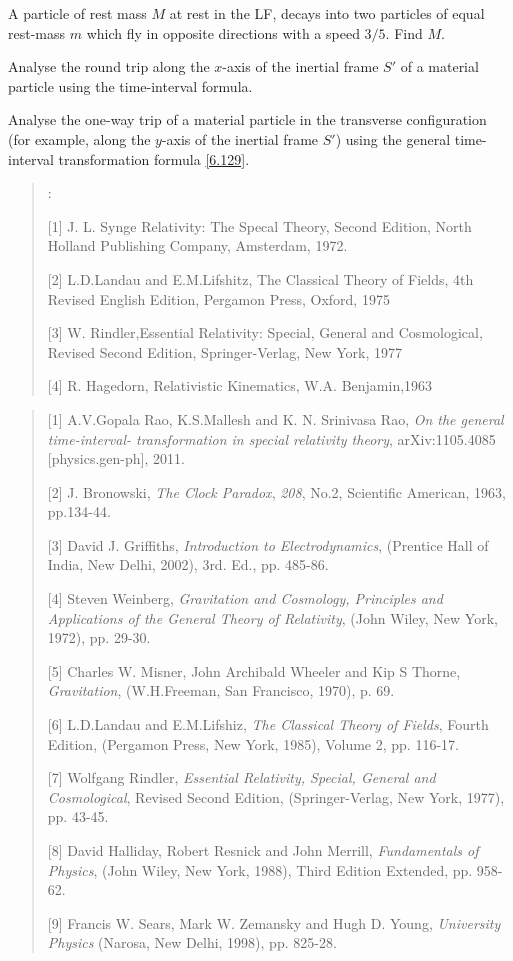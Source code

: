 \exise  A particle of rest mass $M$ at rest in the LF, decays
into two particles of equal rest-mass $m$ which fly in
opposite directions with a speed $3/5$. Find $M$.

\exise  Analyse the round trip along the $x$-axis of the 
inertial frame $S'$ of a material particle using the 
time-interval formula.

\exise Analyse  the one-way trip of a material particle in the
transverse configuration (for example, along the $ y $-axis of
the inertial frame $S'$) using the general time-interval
transformation formula \eqref{6.129}.


\begin{quote}
:

[1] J. L. Synge {Relativity: The Specal Theory}, Second 
Edition, North Holland Publishing Company, Amsterdam, 1972.

[2] L.D.Landau and E.M.Lifshitz, {The Classical  Theory of 
Fields}, 4th Revised English Edition,   Pergamon Press, 
Oxford, 1975

[3] W. Rindler,{Essential Relativity: Special, General and  
Cosmological}, Revised Second  Edition,  Springer-Verlag, 
New York, 1977

[4] R. Hagedorn, {Relativistic Kinematics}, W.A.  
Benjamin,1963

\end{quote}


\begin{small}
\begin{quote}

[1] A.V.Gopala Rao, K.S.Mallesh and K. N. Srinivasa 
Rao, 
\textsl{On the general time-interval- transformation 
in 
special relativity theory}, arXiv:1105.4085   
[physics.gen-ph], 2011.

[2] J. Bronowski, \textsl{The Clock Paradox}, 
\textsl{208},
No.2, Scientific American, 1963, pp.134-44.

[3] David J. Griffiths, \textsl{Introduction to 
Electrodynamics},  (Prentice Hall of India, New Delhi, 
2002), 3rd. Ed.,  pp. 485-86.

[4] Steven Weinberg, \textsl{Gravitation and 
Cosmology, 
Principles and Applications of the General Theory of 
Relativity}, (John Wiley, New York, 1972), pp. 29-30.

[5] Charles W. Misner, John Archibald Wheeler  and Kip 
S 
Thorne, \textsl{Gravitation}, (W.H.Freeman, San 
Francisco, 
1970), p. 69.

[6] L.D.Landau and E.M.Lifshiz, \textsl{The Classical  
Theory of Fields}, Fourth Edition, (Pergamon Press, 
New 
York, 1985), Volume 2, pp. 116-17. 

[7] Wolfgang Rindler, \textsl{Essential Relativity,  
Special, General and Cosmological}, Revised Second  
Edition, (Springer-Verlag, New York, 1977),   pp. 
43-45.

[8] David Halliday, Robert Resnick and John Merrill, 
\textsl{Fundamentals of Physics}, (John Wiley, New 
York, 
1988), Third Edition Extended,  pp. 958-62.

[9] Francis W. Sears, Mark W. Zemansky and   Hugh D. 
Young, \textsl{University Physics} (Narosa, New Delhi, 
1998), pp. 825-28.
\end{quote}
\end{small}

